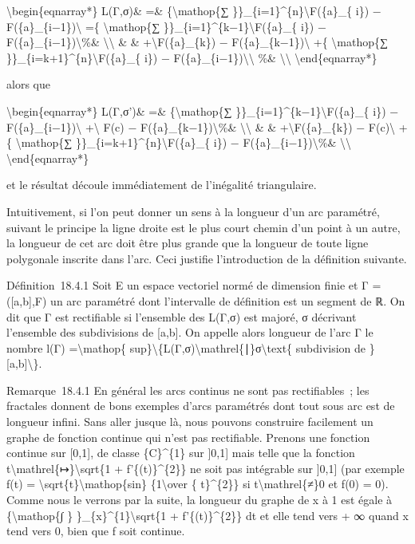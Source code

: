 \documentclass[]{article}
\begin{document}
\textbackslash{}begin\{eqnarray*\} L(Γ,σ)\& =\&
\{\textbackslash{}mathop\{∑
\}\}\_\{i=1\}\^{}\{n\}\textbackslash{}\textbar{}F(\{a\}\_\{ i\}) −
F(\{a\}\_\{i−1\})\textbackslash{}\textbar{} =\{
\textbackslash{}mathop\{∑
\}\}\_\{i=1\}\^{}\{k−1\}\textbackslash{}\textbar{}F(\{a\}\_\{ i\}) −
F(\{a\}\_\{i−1\})\textbackslash{}\textbar{}\%\&
\textbackslash{}\textbackslash{} \& \&
+\textbackslash{}\textbar{}F(\{a\}\_\{k\}) −
F(\{a\}\_\{k−1\})\textbackslash{}\textbar{} +\{
\textbackslash{}mathop\{∑
\}\}\_\{i=k+1\}\^{}\{n\}\textbackslash{}\textbar{}F(\{a\}\_\{ i\}) −
F(\{a\}\_\{i−1\})\textbackslash{}\textbar{}\textbackslash{} \%\&
\textbackslash{}\textbackslash{} \textbackslash{}end\{eqnarray*\}

alors que

\textbackslash{}begin\{eqnarray*\} L(Γ,σ')\& =\&
\{\textbackslash{}mathop\{∑
\}\}\_\{i=1\}\^{}\{k−1\}\textbackslash{}\textbar{}F(\{a\}\_\{ i\}) −
F(\{a\}\_\{i−1\})\textbackslash{}\textbar{} +\textbackslash{}\textbar{}
F(c) − F(\{a\}\_\{k−1\})\textbackslash{}\textbar{}\%\&
\textbackslash{}\textbackslash{} \& \&
+\textbackslash{}\textbar{}F(\{a\}\_\{k\}) −
F(c)\textbackslash{}\textbar{} +\{ \textbackslash{}mathop\{∑
\}\}\_\{i=k+1\}\^{}\{n\}\textbackslash{}\textbar{}F(\{a\}\_\{ i\}) −
F(\{a\}\_\{i−1\})\textbackslash{}\textbar{}\%\&
\textbackslash{}\textbackslash{} \textbackslash{}end\{eqnarray*\}

et le résultat découle immédiatement de l'inégalité triangulaire.

Intuitivement, si l'on peut donner un sens à la longueur d'un arc
paramétré, suivant le principe la ligne droite est le plus court chemin
d'un point à un autre, la longueur de cet arc doit être plus grande que
la longueur de toute ligne polygonale inscrite dans l'arc. Ceci justifie
l'introduction de la définition suivante.

Définition~18.4.1 Soit E un espace vectoriel normé de dimension finie et
Γ = ({[}a,b{]},F) un arc paramétré dont l'intervalle de définition est
un segment de ℝ. On dit que Γ est rectifiable si l'ensemble des L(Γ,σ)
est majoré, σ décrivant l'ensemble des subdivisions de {[}a,b{]}. On
appelle alors longueur de l'arc Γ le nombre l(Γ)
=\textbackslash{}mathop\{
sup\}\textbackslash{}\{L(Γ,σ)\textbackslash{}mathrel\{∣\}σ\textbackslash{}text\{
subdivision de \}{[}a,b{]}\textbackslash{}\}.

Remarque~18.4.1 En général les arcs continus ne sont pas rectifiables~;
les fractales donnent de bons exemples d'arcs paramétrés dont tout sous
arc est de longueur infini. Sans aller jusque là, nous pouvons
construire facilement un graphe de fonction continue qui n'est pas
rectifiable. Prenons une fonction continue sur {[}0,1{]}, de classe
\{C\}\^{}\{1\} sur {]}0,1{]} mais telle que la fonction
t\textbackslash{}mathrel\{↦\}\textbackslash{}sqrt\{1 +
f'\{(t)\}\^{}\{2\}\} ne soit pas intégrable sur {]}0,1{]} (par exemple
f(t) = \textbackslash{}sqrt\{t\}\textbackslash{}mathop\{sin\}
\{1\textbackslash{}over \{ t\}\^{}\{2\}\} si
t\textbackslash{}mathrel\{≠\}0 et f(0) = 0). Comme nous le verrons par
la suite, la longueur du graphe de x à 1 est égale à
\{\textbackslash{}mathop\{∫ \} \}\_\{x\}\^{}\{1\}\textbackslash{}sqrt\{1
+ f'\{(t)\}\^{}\{2\}\} dt et elle tend vers + ∞ quand x tend vers 0,
bien que f soit continue.
\end{document}
